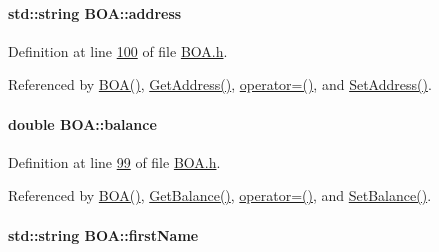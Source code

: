 \paragraph[{\texorpdfstring{address}{address}}]{\setlength{\rightskip}{0pt plus 5cm}std\+::string B\+O\+A\+::address\hspace{0.3cm}{\ttfamily [private]}}\hypertarget{class_b_o_a_afb2d7d0c5c05169a72bbc6f1d2cc737f_afb2d7d0c5c05169a72bbc6f1d2cc737f}{}\label{class_b_o_a_afb2d7d0c5c05169a72bbc6f1d2cc737f_afb2d7d0c5c05169a72bbc6f1d2cc737f}


Definition at line \hyperlink{_b_o_a_8h_source_l00100}{100} of file \hyperlink{_b_o_a_8h_source}{B\+O\+A.\+h}.



Referenced by \hyperlink{_b_o_a_8h_source_l00024}{B\+O\+A()}, \hyperlink{_b_o_a_8cpp_source_l00064}{Get\+Address()}, \hyperlink{_b_o_a_8h_source_l00064}{operator=()}, and \hyperlink{_b_o_a_8cpp_source_l00060}{Set\+Address()}.

\paragraph[{\texorpdfstring{balance}{balance}}]{\setlength{\rightskip}{0pt plus 5cm}double B\+O\+A\+::balance\hspace{0.3cm}{\ttfamily [private]}}\hypertarget{class_b_o_a_a2061c36a15924de9186ec5c83dc7da2f_a2061c36a15924de9186ec5c83dc7da2f}{}\label{class_b_o_a_a2061c36a15924de9186ec5c83dc7da2f_a2061c36a15924de9186ec5c83dc7da2f}


Definition at line \hyperlink{_b_o_a_8h_source_l00099}{99} of file \hyperlink{_b_o_a_8h_source}{B\+O\+A.\+h}.



Referenced by \hyperlink{_b_o_a_8h_source_l00024}{B\+O\+A()}, \hyperlink{_b_o_a_8cpp_source_l00072}{Get\+Balance()}, \hyperlink{_b_o_a_8h_source_l00064}{operator=()}, and \hyperlink{_b_o_a_8cpp_source_l00068}{Set\+Balance()}.

\paragraph[{\texorpdfstring{first\+Name}{firstName}}]{\setlength{\rightskip}{0pt plus 5cm}std\+::string B\+O\+A\+::first\+Name\hspace{0.3cm}{\ttfamily [private]}}\hypertarget{class_b_o_a_acb1b3b2a69e403c4e0e3fb08fdbb52a0_acb1b3b2a69e403c4e0e3fb08fdbb52a0}{}\label{class_b_o_a_acb1b3b2a69e403c4e0e3fb08fdbb52a0_acb1b3b2a69e403c4e0e3fb08fdbb52a0}


